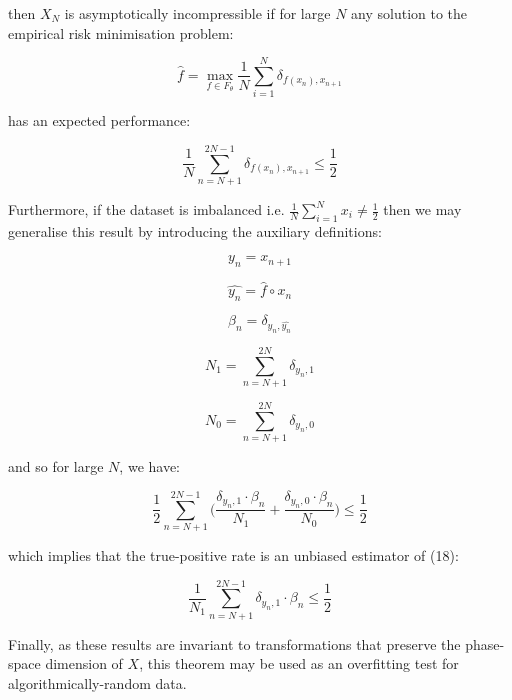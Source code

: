 \documentclass{article}
\begin{document}
then $X_N$ is asymptotically incompressible if for large $N$ any solution to the 
empirical risk minimisation problem: 

\begin{equation}
\hat{f} = \max_{f \in F_{\theta}} \frac{1}{N} \sum_{i=1}^N \delta_{f(x_n),x_{n+1}}
\end{equation}

has an expected performance: 

\begin{equation}
\frac{1}{N} \sum_{n=N+1}^{2N-1} \delta_{f(x_n),x_{n+1}} \leq \frac{1}{2}
\end{equation}

Furthermore, if the dataset is imbalanced i.e. $\frac{1}{N} \sum_{i=1}^N x_i \neq \frac{1}{2}$ then we may generalise this result by introducing the auxiliary definitions: 

\begin{equation}
y_n = x_{n+1}	
\end{equation}

\begin{equation}
\hat{y_n} = \hat{f} \circ x_n	
\end{equation}

\begin{equation}
\beta_n = \delta_{y_n,\hat{y_n}}	
\end{equation}

\begin{equation}
N_1 = \sum_{n=N+1}^{2N} \delta_{y_n,1}	
\end{equation}

\begin{equation}
N_0 = \sum_{n=N+1}^{2N} \delta_{y_n,0}	
\end{equation}

and so for large $N$, we have: 

\begin{equation}
\frac{1}{2} \sum_{n=N+1}^{2N-1} \Big(\frac{\delta_{y_n,1} \cdot \beta_n}{N_1} + \frac{\delta_{y_n,0} \cdot \beta_n}{N_0} \Big) \leq \frac{1}{2}
\end{equation}

which implies that the true-positive rate is an unbiased estimator of (18):


\begin{equation}
\frac{1}{N_1}\sum_{n=N+1}^{2N-1} \delta_{y_n,1} \cdot \beta_n \leq \frac{1}{2}
\end{equation}

Finally, as these results are invariant to transformations that preserve the 
phase-space dimension of $X$, this theorem may be used as an overfitting test 
for algorithmically-random data. 
\end{document}
